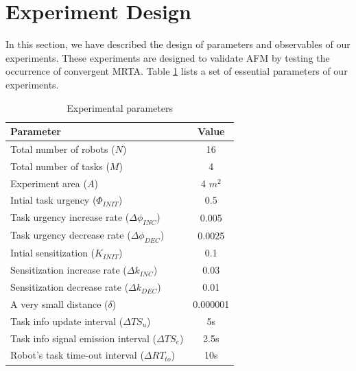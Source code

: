\documentclass[letterpaper, 10 pt, conference]{ieeeconf}  %
\begin{document}
\section{Experiment Design}
\label{sec:expt-design}
In this section, we have described the design of parameters and observables of our experiments.
These experiments are designed to validate AFM by testing the occurrence of convergent MRTA. Table \ref{table:params} lists a set of essential parameters of our experiments. 
%
\begin{table}
\caption{Experimental parameters}
\label{table:params}
\begin{center}
\begin{tabular}{|l||c|}
\hline Parameter & Value\\
\hline Total number of robots ($N$) & 16\\
\hline Total number of tasks ($M$) & 4\\
\hline Experiment area ($A$) & 4 $m^2$\\
\hline Intial task urgency ($\Phi_{INIT}$) & 0.5\\
\hline Task urgency increase rate ($\Delta\phi_{INC}$) & 0.005\\
\hline Task urgency decrease rate ($\Delta\phi_{DEC}$) & 0.0025\\
\hline Intial sensitization ($K_{INIT}$) & 0.1\\
\hline Sensitization increase rate ($\Delta k_{INC}$) & 0.03\\
\hline Sensitization decrease rate ($\Delta k_{DEC}$) & 0.01\\
\hline A very small distance ($\delta$)& 0.000001\\
\hline Task info update interval ($\Delta TS_{u}$) & 5s\\
\hline Task info signal emission interval ($ \Delta TS_{e}$)& 2.5s\\
\hline Robot's task time-out interval ($\Delta RT_{to} $)& 10s\\
\hline
\end{tabular}
\end{center}
\end{table}
\end{document}
